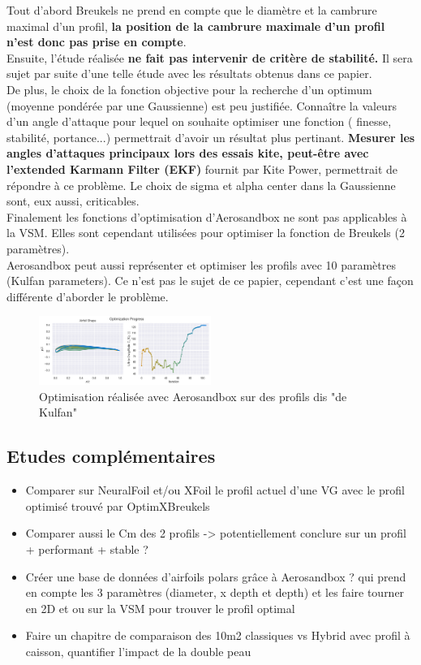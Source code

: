 \documentclass[conference]{IEEEtran}
\begin{document}
Tout d'abord Breukels ne prend en compte que le diamètre et la cambrure maximal d'un profil, \textbf{la position de la cambrure maximale d'un profil n'est donc pas prise en compte}. \\

Ensuite, l'étude réalisée \textbf{ne fait pas intervenir de critère de stabilité.} Il sera sujet par suite d'une telle étude avec les résultats obtenus dans ce papier.\\

De plus, le choix de la fonction objective pour la recherche d'un optimum (moyenne pondérée par une Gaussienne) est peu justifiée. Connaître la valeurs d'un angle d'attaque pour lequel on souhaite optimiser une fonction ( finesse, stabilité, portance...) permettrait d'avoir un résultat plus pertinant. \textbf{Mesurer les angles d'attaques principaux lors des essais kite, peut-être avec l'extended Karmann Filter (EKF)} fournit par Kite Power, permettrait de répondre à ce problème. Le choix de sigma et alpha center dans la Gaussienne sont, eux aussi, criticables.\\

Finalement les fonctions d'optimisation d'Aerosandbox ne sont pas applicables à la VSM. Elles sont cependant utilisées pour optimiser la fonction de Breukels (2 paramètres). \\
Aerosandbox peut aussi représenter et optimiser les profils avec 10 paramètres (Kulfan parameters). Ce n'est pas le sujet de ce papier, cependant c'est une façon différente d'aborder le problème. 

\begin{figure}[H]
    \centering
    \includegraphics[width=0.5\textwidth]{Pics/optim neuralfoil.png}  
    \caption{Optimisation réalisée avec Aerosandbox sur des profils dis "de Kulfan"}
    \label{fig:kulfan}
\end{figure}

\subsection{Etudes complémentaires}

\begin{itemize}
    \item Comparer sur NeuralFoil et/ou XFoil le profil actuel d’une VG avec le profil optimisé trouvé par OptimXBreukels
    \item Comparer aussi le Cm des 2 profils -> potentiellement conclure sur un profil + performant + stable ?
    \item Créer une base de données d'airfoils polars grâce à Aerosandbox ? qui prend en compte les 3 paramètres (diameter, x depth et depth) et les faire tourner en 2D et ou sur la VSM pour trouver le profil optimal
    \item Faire un chapitre de comparaison des 10m2 classiques vs Hybrid avec profil à caisson, quantifier l'impact de la double peau
\end{itemize}
\end{document}
